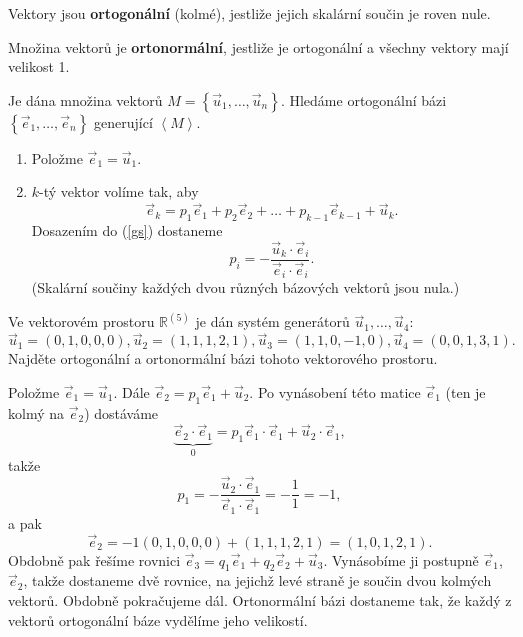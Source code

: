 \begin{definition}
    Vektory jsou \textbf{ortogonální} (kolmé), jestliže jejich skalární součin
    je roven nule.
\end{definition}

\begin{definition}
    Množina vektorů je \textbf{ortonormální}, jestliže je ortogonální a všechny vektory mají
    velikost 1.
\end{definition}

\begin{algoritmus}
    Je dána množina vektorů $M=\left \{ \vec u_1,\dots, \vec u_n \right \}$.
    Hledáme ortogonální bázi $\left \{ \vec e_1, \dots, \vec e_n \right \}$
    generující $\left<  M \right>.$
    \begin{enumerate}[1.]
    \item Položme $\vec e_1 = \vec u_1.$
   	\item $k$-tý vektor volíme tak, aby
    \begin{equation}\label{gs}
    \vec e_k = p_1\vec e_1 + p_2\vec e_2 + \dots +p_{k-1} \vec e_{k-1} + \vec u_k.
    \end{equation}
    Dosazením do (\ref{gs}) dostaneme
    $$p_i = -\frac{\vec u_k\cdot \vec e_i}{\vec e_i\cdot \vec e_i}.$$
    (Skalární součiny každých dvou různých bázových vektorů jsou nula.)
    \end{enumerate}
\end{algoritmus}

\begin{priklad}
Ve vektorovém prostoru $\mathbb R^{(5)}$ je dán systém generátorů $\vec u_1,\dots,\vec u_4$:
$$
    \vec u_1 = (0,1,0,0,0), \vec u_2 = (1,1,1,2,1), \vec u_3 = (1,1,0,-1,0), \vec u_4 = (0,0,1,3,1).
$$
Najděte ortogonální a ortonormální bázi tohoto vektorového prostoru.
\end{priklad}

\begin{reseni}
Položme $\vec e_1=\vec u_1.$ Dále $\vec e_2 = p_1\vec e_1 + \vec u_2$. Po vynásobení
této matice $\vec e_1$ (ten je kolmý na $\vec e_2$) dostáváme
$$\underbrace{\vec e_2\cdot \vec e_1}_{0}=p_1\vec e_1\cdot\vec e_1+\vec u_2\cdot\vec e_1,$$
takže
$$p_1=-\frac{\vec u_2\cdot\vec e_1}{\vec e_1\cdot\vec e_1} = -\frac{1}{1}=-1,$$
a pak
$$\vec e_2 = -1(0,1,0,0,0)+(1,1,1,2,1)=(1,0,1,2,1).$$
Obdobně pak řešíme rovnici $\vec e_3=q_1\vec e_1 + q_2\vec e_2 + \vec u_3$. Vynásobíme
ji postupně $\vec e_1$, $\vec e_2$, takže dostaneme dvě rovnice, na jejichž levé straně
je součin dvou kolmých vektorů. Obdobně pokračujeme dál. Ortonormální bázi
dostaneme tak, že každý z vektorů ortogonální báze vydělíme jeho velikostí.
\end{reseni}

